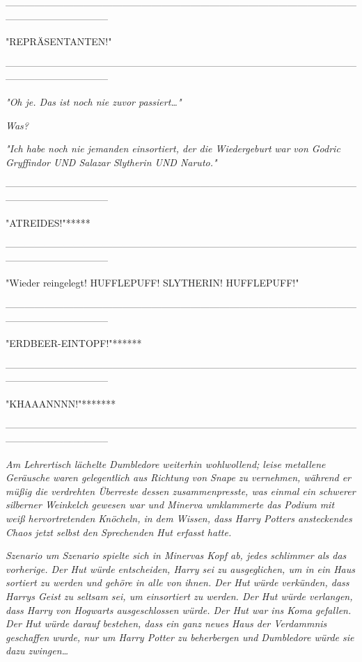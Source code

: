 {--------------------------------------------------------------------------------------------------------------------------------------------

"REPRÄSENTANTEN!"

--------------------------------------------------------------------------------------------------------------------------------------------

\emph{"\emph{Oh je. Das ist noch nie zuvor passiert…}"}

\emph{\emph{Was?}}

\emph{"\emph{Ich habe noch nie jemanden einsortiert, der die Wiedergeburt}} \emph{\emph{war}} \emph{\emph{von Godric Gryffindor UND Salazar Slytherin UND Naruto.}"}

--------------------------------------------------------------------------------------------------------------------------------------------

"ATREIDES!"*****

--------------------------------------------------------------------------------------------------------------------------------------------

"Wieder reingelegt! HUFFLEPUFF! SLYTHERIN! HUFFLEPUFF!"

--------------------------------------------------------------------------------------------------------------------------------------------

"ERDBEER-EINTOPF!"******

--------------------------------------------------------------------------------------------------------------------------------------------

"KHAAANNNN!"*******

--------------------------------------------------------------------------------------------------------------------------------------------

\emph{Am Lehrertisch lächelte Dumbledore weiterhin wohlwollend; leise metallene Geräusche waren gelegentlich aus Richtung von Snape zu vernehmen, während er müßig die verdrehten Überreste dessen zusammenpresste, was einmal ein schwerer silberner Weinkelch gewesen war und Minerva umklammerte das Podium mit weiß hervortretenden Knöcheln, in dem Wissen, dass Harry Potters ansteckendes Chaos jetzt selbst den Sprechenden Hut erfasst hatte.}

\emph{Szenario um Szenario spielte sich in Minervas Kopf ab, jedes schlimmer als das vorherige. Der Hut würde entscheiden, Harry sei zu ausgeglichen, um in ein Haus sortiert zu werden und gehöre in alle von ihnen. Der Hut würde verkünden, dass Harrys Geist zu seltsam sei, um einsortiert zu werden. Der Hut würde verlangen, dass Harry von Hogwarts ausgeschlossen würde. Der Hut war ins Koma gefallen. Der Hut würde darauf bestehen, dass ein ganz neues Haus der Verdammnis geschaffen wurde, nur um Harry Potter zu beherbergen und} \emph{\emph{Dumbledore würde sie dazu zwingen…}}

}
